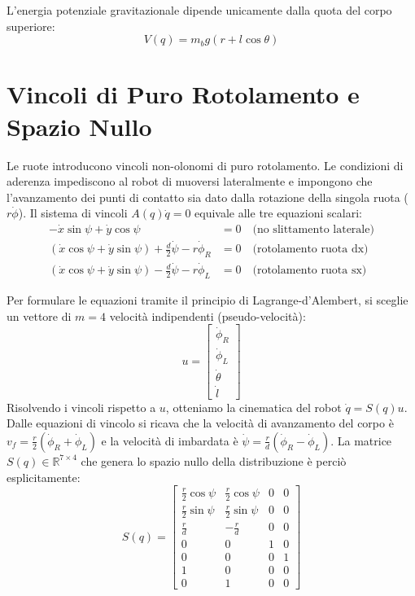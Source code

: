 \documentclass[11pt,a4paper]{article}
\begin{document}
L'energia potenziale gravitazionale dipende unicamente dalla quota del corpo superiore:
\begin{equation}
    V(q) = m_b g (r + l \cos\theta)
\end{equation}

\section{Vincoli di Puro Rotolamento e Spazio Nullo}

Le ruote introducono vincoli non-olonomi di puro rotolamento. Le condizioni di aderenza impediscono al robot di muoversi lateralmente e impongono che l'avanzamento dei punti di contatto sia dato dalla rotazione della singola ruota ($r\dot{\phi}$). Il sistema di vincoli $A(q)\dot{q} = 0$ equivale alle tre equazioni scalari:
\begin{align}
    -\dot{x}\sin\psi + \dot{y}\cos\psi &= 0 \quad \text{(no slittamento laterale)} \\
    (\dot{x}\cos\psi + \dot{y}\sin\psi) + \frac{d}{2}\dot{\psi} - r\dot{\phi}_R &= 0 \quad \text{(rotolamento ruota dx)} \\
    (\dot{x}\cos\psi + \dot{y}\sin\psi) - \frac{d}{2}\dot{\psi} - r\dot{\phi}_L &= 0 \quad \text{(rotolamento ruota sx)}
\end{align}

Per formulare le equazioni tramite il principio di Lagrange-d'Alembert, si sceglie un vettore di $m = 4$ velocità indipendenti (pseudo-velocità):
\begin{equation}
    u = \begin{bmatrix} \dot{\phi}_R \\ \dot{\phi}_L \\ \dot{\theta} \\ \dot{l} \end{bmatrix}
\end{equation}
Risolvendo i vincoli rispetto a $u$, otteniamo la cinematica del robot $\dot{q} = S(q)u$. Dalle equazioni di vincolo si ricava che la velocità di avanzamento del corpo è $v_f = \frac{r}{2}(\dot{\phi}_R + \dot{\phi}_L)$ e la velocità di imbardata è $\dot{\psi} = \frac{r}{d}(\dot{\phi}_R - \dot{\phi}_L)$. La matrice $S(q) \in \mathbb{R}^{7 \times 4}$ che genera lo spazio nullo della distribuzione è perciò esplicitamente:
\begin{equation}
    S(q) = \begin{bmatrix}
    \frac{r}{2}\cos\psi & \frac{r}{2}\cos\psi & 0 & 0 \\
    \frac{r}{2}\sin\psi & \frac{r}{2}\sin\psi & 0 & 0 \\
    \frac{r}{d} & -\frac{r}{d} & 0 & 0 \\
    0 & 0 & 1 & 0 \\
    0 & 0 & 0 & 1 \\
    1 & 0 & 0 & 0 \\
    0 & 1 & 0 & 0
    \end{bmatrix}
\end{equation}
\end{document}
